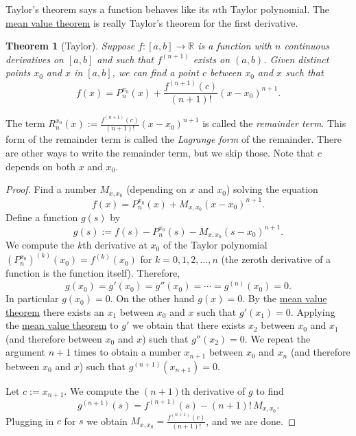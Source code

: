 \documentclass[12pt]{book}
\newcommand{\R}{{\mathbb{R}}}
\newcommand{\myindex}[1]{#1\index{#1}}
\theoremstyle{plain}
\newtheorem{thm}{Theorem}[section]
\theoremstyle{remark}
\theoremstyle{definition}
\theoremstyle{exercise}
\theoremstyle{example}
\begin{document}
Taylor's theorem says a function behaves like its $n$th
Taylor polynomial.  The 
\hyperref[thm:mvt]{mean value theorem} is really Taylor's theorem
for the first derivative.

\begin{thm}[Taylor] \label{thm:taylor}
Suppose $f \colon [a,b] \to \R$ is a function with $n$ continuous
derivatives on $[a,b]$ and such that $f^{(n+1)}$ exists on $(a,b)$.
Given distinct points $x_0$ and $x$ in $[a,b]$,
we can find a point $c$ between $x_0$
and $x$ such that
\begin{equation*}
f(x)=P_{n}^{x_0}(x)+\frac{f^{(n+1)}(c)}{(n+1)!}{(x-x_0)}^{n+1} .
\end{equation*}
\end{thm}

The term $R_n^{x_0}(x):=\frac{f^{(n+1)}(c)}{(n+1)!}{(x-x_0)}^{n+1}$ is called the
\emph{remainder term}.  This
form 
of the remainder term is called the
\emph{\myindex{Lagrange form}} of the remainder.  There are other ways
to write the remainder term, but we skip those.  Note that $c$ depends on
both $x$ and $x_0$.

\begin{proof}
Find a number $M_{x,x_0}$ (depending on $x$ and $x_0$) solving the equation
\begin{equation*}
f(x)=P_{n}^{x_0}(x)+M_{x,x_0}{(x-x_0)}^{n+1} .
\end{equation*}
Define a function $g(s)$ by
\begin{equation*}
g(s) := f(s)-P_n^{x_0}(s)-M_{x,x_0}{(s-x_0)}^{n+1} .
\end{equation*}
We compute
the $k$th derivative at $x_0$ of the Taylor polynomial
${(P_n^{x_0})}^{(k)}(x_0) = f^{(k)}(x_0)$ for
$k=0,1,2,\ldots,n$ (the zeroth derivative of a function is the function
itself).  Therefore,
\begin{equation*}
g(x_0) = g'(x_0) = g''(x_0) = \cdots = g^{(n)}(x_0) = 0 .
\end{equation*}
In particular $g(x_0) = 0$.
On the other hand $g(x) = 0$.  By the
\hyperref[thm:mvt]{mean value theorem}
there exists an $x_1$ between $x_0$ and $x$ such that $g'(x_1) = 0$.
Applying the \hyperref[thm:mvt]{mean value theorem}
to $g'$ we obtain that there exists
$x_2$ between $x_0$ and $x_1$ (and therefore between $x_0$ and $x$)
such that $g''(x_2) = 0$.  We repeat the
argument $n+1$ times to obtain a number $x_{n+1}$ between $x_0$ and $x_n$
(and therefore between $x_0$ and $x$) such that $g^{(n+1)}(x_{n+1}) = 0$.

Let $c:=x_{n+1}$.
We compute the $(n+1)$th derivative of $g$ to find
\begin{equation*}
g^{(n+1)}(s) = f^{(n+1)}(s)-(n+1)!\,M_{x,x_0} .
\end{equation*}
Plugging in $c$ for $s$ we obtain $M_{x,x_0} = \frac{f^{(n+1)}(c)}{(n+1)!}$, and
we are done.
\end{proof}
\end{document}
